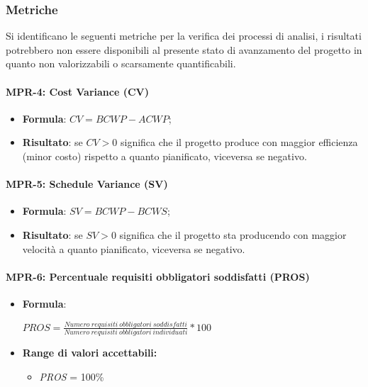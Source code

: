 \subsubsection{Metriche}

Si identificano le seguenti metriche per la verifica dei processi di analisi, i risultati potrebbero non essere disponibili al presente stato di avanzamento del progetto
in quanto non valorizzabili o scarsamente quantificabili.



\paragraph{MPR-4: Cost Variance (CV)} \label{_MPR-4}
\begin{itemize}
    \item \textbf{Formula}: $CV = BCWP - ACWP$;
    \item \textbf{Risultato}: se $CV > 0$ significa che il progetto produce con maggior efficienza (minor costo) rispetto a quanto pianificato, viceversa se negativo.
\end{itemize}

\paragraph{MPR-5: Schedule Variance (SV)} \label{_MPR-5}
\begin{itemize}
    \item \textbf{Formula}: $SV = BCWP - BCWS$;
    \item \textbf{Risultato}: se $SV > 0$ significa che il progetto sta producendo con maggior velocità a quanto pianificato, viceversa se negativo.
\end{itemize}



\paragraph{MPR-6: Percentuale requisiti obbligatori soddisfatti (PROS)}
    
 \begin{itemize}
    \item \textbf{Formula}:
    \begin{center}
        \(PROS = \frac{Numero\ requisiti\ obbligatori\ soddisfatti}{Numero\ requisiti\  obbligatori\ individuati}*100\)
    \end{center}

    \item \textbf{Range di valori accettabili:}
    \begin{itemize}
        \item  \textit{PROS} = 100\%
    \end{itemize}
\end{itemize}
    
